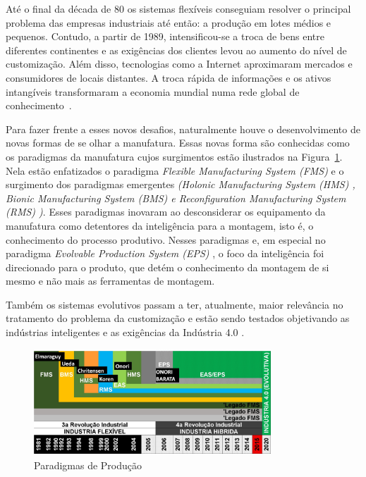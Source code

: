 \documentclass[10pt,letterpaper,twocolumn]{IEEEtran}
\begin{document}
Até o final da década de 80 os sistemas flexíveis conseguiam resolver o principal problema das empresas industriais até então: a produção em lotes médios e pequenos. Contudo, a partir de 1989, intensificou-se a troca de bens entre diferentes continentes e as exigências dos clientes levou ao aumento do nível de customização. Além disso, tecnologias como a Internet aproximaram mercados e consumidores de locais distantes. A troca rápida de informações e os ativos intangíveis transformaram a economia mundial numa rede global de conhecimento~\cite{E.Abele}.

Para fazer frente a esses novos desafios, naturalmente houve o desenvolvimento de novas formas de se olhar a manufatura. Essas novas forma são conhecidas como os paradigmas da manufatura cujos surgimentos estão ilustrados  na Figura~\ref{F5}. Nela estão enfatizados o paradigma \textit{Flexible Manufacturing System (FMS)} \cite{FMS} e o surgimento dos paradigmas emergentes \textit{(Holonic Manufacturing System (HMS) \cite{Christensen,VanBrussel}, Bionic Manufacturing System (BMS) \cite{BMS} e \textit{Reconfiguration Manufacturing System (RMS)} \cite{RMS})}. Esses paradigmas inovaram ao desconsiderar os equipamento da manufatura como detentores da inteligência para a montagem, isto é, o conhecimento do processo produtivo. Nesses paradigmas e, em especial no paradigma \textit{Evolvable Production System (EPS)} \cite{M.Onori_a}, o foco da inteligência foi direcionado para o produto, que detém o conhecimento da montagem de si mesmo e não mais as ferramentas de montagem. 

Também os sistemas evolutivos passam a ter, atualmente, maior relevância no tratamento do problema da customização e estão sendo testados objetivando as indústrias inteligentes e as exigências da Indústria 4.0 \cite{BITKOM2015,VDE2014}. 

 \begin{figure}[h!]
 	\centering
 	\includegraphics[width=8.9cm, height=4cm]{MeDSE_imagens/F7_MeDSE_PARAD1.jpg} 
 	\caption{Paradigmas de Produção}
 	\label{F5}
 \end{figure}
\end{document}
